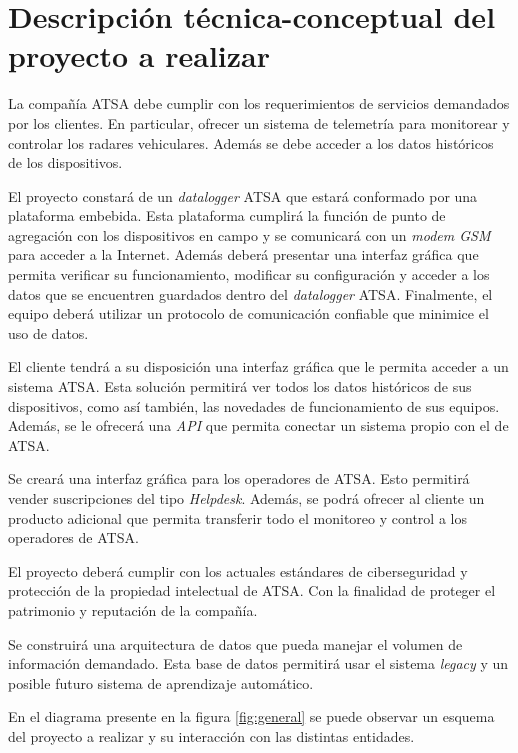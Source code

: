 \documentclass[
12pt,
spanish,
singlespacing,
parskip,
headsepline,]{article}
\begin{document}
\section{Descripción técnica-conceptual del proyecto a realizar}

La compañía ATSA debe cumplir con los requerimientos de servicios demandados por los clientes.
En particular, ofrecer un sistema de telemetría para monitorear y controlar los radares vehiculares.
Además se debe acceder a los datos históricos de los dispositivos.

El proyecto constará de un \emph{datalogger} ATSA que estará conformado por una plataforma embebida.
Esta plataforma cumplirá la función de punto de agregación con los dispositivos en campo y se comunicará con un \emph{modem GSM} para acceder a la Internet.
Además deberá presentar una interfaz gráfica que permita verificar su funcionamiento, modificar su configuración y acceder a los datos que se encuentren guardados dentro del \emph{datalogger} ATSA.
Finalmente, el equipo deberá utilizar un protocolo de comunicación confiable que minimice el uso de datos.

El cliente tendrá a su disposición una interfaz gráfica que le permita acceder a un sistema ATSA.
Esta solución permitirá ver todos los datos históricos de sus dispositivos, como así también, las novedades de funcionamiento de sus equipos.
Además, se le ofrecerá una \emph{API} que permita conectar un sistema propio con el de ATSA.

Se creará una interfaz gráfica para los operadores de ATSA.
Esto permitirá vender suscripciones del tipo \emph{Helpdesk}.
Además, se podrá ofrecer al cliente un producto adicional que permita transferir todo el monitoreo y control a los operadores de ATSA.

El proyecto deberá cumplir con los actuales estándares de ciberseguridad y protección de la propiedad intelectual de ATSA.
Con la finalidad de proteger el patrimonio y reputación de la compañía.

Se construirá una arquitectura de datos que pueda manejar el volumen de información demandado. Esta base de datos permitirá usar el sistema \emph{legacy} y un posible futuro sistema de aprendizaje automático.

En el diagrama presente en la figura \ref{fig:general} se puede observar un esquema del proyecto a realizar y su interacción con las distintas entidades.
\end{document}
